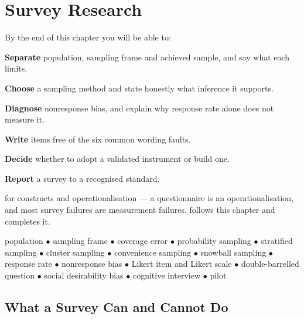 \chapter{Survey Research}\label{ch:survey}

\begin{outcomes}
By the end of this chapter you will be able to:
\begin{tight}
  \item \textbf{Separate} population, sampling frame and achieved sample, and
    say what each limits.
  \item \textbf{Choose} a sampling method and state honestly what inference it
    supports.
  \item \textbf{Diagnose} nonresponse bias, and explain why response rate alone
    does not measure it.
  \item \textbf{Write} items free of the six common wording faults.
  \item \textbf{Decide} whether to adopt a validated instrument or build one.
  \item \textbf{Report} a survey to a recognised standard.
\end{tight}
\end{outcomes}

\begin{prereq}
 for constructs and operationalisation --- a questionnaire is
an operationalisation, and most survey failures are measurement failures.
 follows this chapter and completes it.
\end{prereq}

\begin{keyterms}
population $\bullet$ sampling frame $\bullet$ coverage error $\bullet$
probability sampling $\bullet$ stratified sampling $\bullet$ cluster sampling
$\bullet$ convenience sampling $\bullet$ snowball sampling $\bullet$ response
rate $\bullet$ nonresponse bias $\bullet$ Likert item and Likert scale
$\bullet$ double-barrelled question $\bullet$ social desirability bias
$\bullet$ cognitive interview $\bullet$ pilot
\end{keyterms}

\section{What a Survey Can and Cannot Do}

